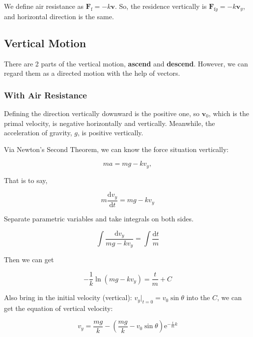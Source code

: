 \documentclass{article}
\begin{document}
We define air resistance as $\boldsymbol{F}_\mathrm{f}=-k\boldsymbol{v}$. So, the residence vertically is $\boldsymbol{F}_{\mathrm{f}y}=-k\boldsymbol{v}_y$, and horizontal direction is the same.

\subsection{Vertical Motion}

There are 2 parts of the vertical motion, \textbf{ascend} and \textbf{descend}. However, we can regard them as a directed motion with the help of vectors.

\subsubsection{With Air Resistance}

Defining the direction vertically downward is the positive one, so $\boldsymbol{v}_0$, which is the primal velocity, is negative horizontally and vertically. Meanwhile, the acceleration of gravity, $g$, is positive vertically.

Via Newton's Second Theorem, we can know the force situation vertically:

\newcommand{\derive}{\mathrm{d}}

\begin{equation*}
    ma = mg - kv_y,
\end{equation*}

That is to say,

\begin{equation}
    m\dfrac{\derive v_y}{\derive t} = mg - kv_y
\end{equation}

Separate parametric variables and take integrals on both sides.

\begin{equation}
    \int\dfrac{\derive v_y}{mg - kv_y} = \int\dfrac{\derive t}{m}
\end{equation}

Then we can get

\begin{equation}
    -\dfrac{1}{k}\ln\left(mg-kv_y\right)=\dfrac{t}{m}+C
\end{equation}

Also bring in the initial velocity (vertical): $v_y\big\vert_{t=0}=v_0\sin\theta$ into the $C$, we can get the equation of vertical velocity:

\begin{equation}
    v_y=\dfrac{mg}{k}-\left(\dfrac{mg}{k}-v_0\sin\theta\right)\mathrm{e}^{-\frac{t}{m}k} \label{eq:vertical-velocity}
\end{equation}
\end{document}
